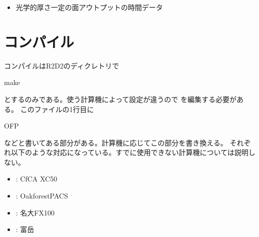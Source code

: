 \documentclass[letterpaper,10pt,dvipdfmx,report]{sphinxmanual}
\begin{document}
\begin{itemize}
\begin{description}
\begin{itemize}
\begin{description}
\begin{itemize}
\begin{description}
\end{description}

\item {} \begin{description}
\sphinxAtStartPar
光学的厚さ一定の面アウトプットの時間データ

\end{description}

\end{itemize}

\end{description}

\end{itemize}

\end{description}

\end{itemize}


\section{コンパイル}
\label{\detokenize{start:id2}}
\sphinxAtStartPar
コンパイルはR2D2のディクレトリで

\begin{sphinxVerbatim}[commandchars=\\\{\}]
make
\end{sphinxVerbatim}

\sphinxAtStartPar
とするのみである。使う計算機によって設定が違うので  を編集する必要がある。
このファイルの1行目に

\begin{sphinxVerbatim}[commandchars=\\\{\}]
OFP
\end{sphinxVerbatim}

\sphinxAtStartPar
などと書いてある部分がある。計算機に応じてこの部分を書き換える。
それぞれ以下のような対応になっている。すでに使用できない計算機については説明しない。
\begin{itemize}
\item {} 
\sphinxAtStartPar
{}: CfCA XC50

\item {} 
\sphinxAtStartPar
{}: Oakforest\sphinxhyphen{}PACS

\item {} 
\sphinxAtStartPar
{}: 名大FX100

\item {} 
\sphinxAtStartPar
{}: 富岳

\end{itemize}
\end{document}
